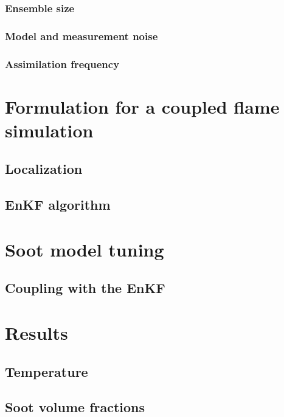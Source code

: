 \subsubsection{Ensemble size} \label{sec:enkf_testEnsembleSize}

\subsubsection{Model and measurement noise} \label{sec:enkf_testNoises}

\subsubsection{Assimilation frequency} \label{sec:enkf_testAssimFreq}


\section{Formulation for a coupled flame simulation}\label{sec:EnKF_coupledFlameSimulation}





\subsection{Localization} \label{localization}


\subsection{EnKF algorithm} \label{enkf_algorithm}





\section{Soot model tuning}\label{soot_model_tuning}

\subsection{Coupling with the EnKF}



\section{Results}\label{sec:enkf_results}


\subsection{Temperature}


\subsection{Soot volume fractions}
